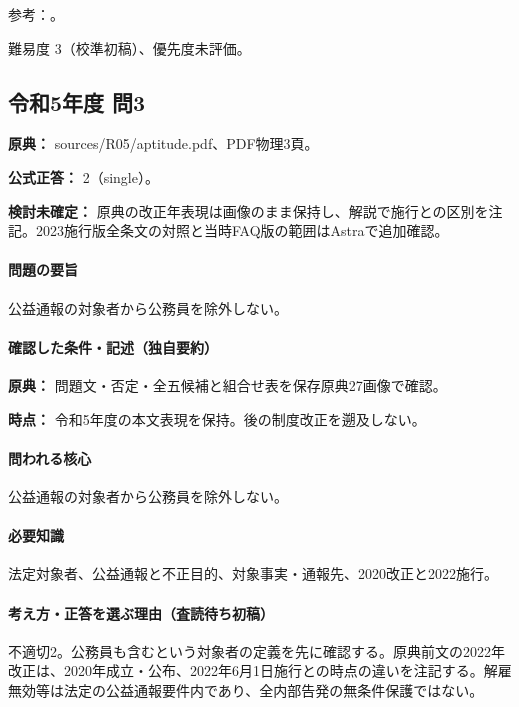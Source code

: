 \par 参考：\cite{caa_handbook_pre2022,saf53_whistle_oldfaq}。

\par 難易度 3（校準初稿）、優先度未評価。

\subsection{令和5年度 問3}
\label{q:r05-reg-apt-03}

\noindent\textbf{原典：} sources/R05/aptitude.pdf、PDF物理3頁。

\textbf{公式正答：} 2（single）。

\par\textbf{検討未確定：} 原典の改正年表現は画像のまま保持し、解説で施行との区別を注記。2023施行版全条文の対照と当時FAQ版の範囲はAstraで追加確認。

\paragraph{問題の要旨} 公益通報の対象者から公務員を除外しない。

\paragraph{確認した条件・記述（独自要約）}\mbox{}\par

\noindent\textbf{原典：} 問題文・否定・全五候補と組合せ表を保存原典27画像で確認。\par

\noindent\textbf{時点：} 令和5年度の本文表現を保持。後の制度改正を遡及しない。\par

\paragraph{問われる核心} 公益通報の対象者から公務員を除外しない。

\paragraph{必要知識} 法定対象者、公益通報と不正目的、対象事実・通報先、2020改正と2022施行。

\paragraph{考え方・正答を選ぶ理由（査読待ち初稿）} 不適切2。公務員も含むという対象者の定義を先に確認する。原典前文の2022年改正は、2020年成立・公布、2022年6月1日施行との時点の違いを注記する。解雇無効等は法定の公益通報要件内であり、全内部告発の無条件保護ではない。

